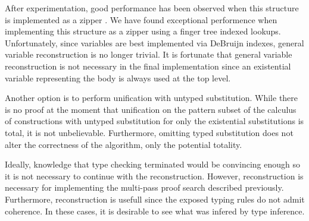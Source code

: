 After experimentation, good performance has been observed when this structure is implemented
as a zipper \citep{huet1997functional}. We have found exceptional performence when implementing this structure
as a zipper using a finger tree indexed lookups. Unfortunately, since variables are best 
implemented via DeBruijn indexes, general variable reconstruction is no longer trivial.  It is fortunate that general variable reconstruction 
is not necessary in the final implementation since an existential variable representing the body is always used at the top level.

Another option is to perform unification with untyped substitution.
While there is no proof at the moment that unification on the pattern subset of 
the calculus of constructions with untyped substitution for only the existential substitutions
is total, it is not unbelievable. Furthermore, omitting typed substitution does not alter
the correctness of the algorithm, only the potential totality.  

Ideally, knowledge that type checking terminated would be convincing enough
so it is not necessary to continue with the reconstruction.  However, reconstruction
is necessary for implementing the multi-pass proof search described previously.  
Furthermore, reconstruction is usefull since the exposed typing rules do not admit 
coherence.  In these cases, it is desirable to see what was infered by type inference.

